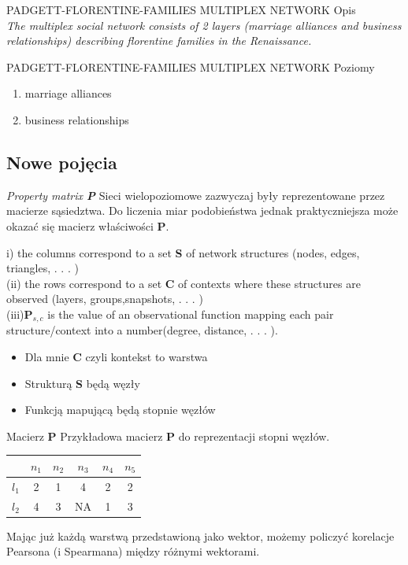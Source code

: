 \documentclass{beamer}
\begin{document}
\begin{frame}{PADGETT-FLORENTINE-FAMILIES
MULTIPLEX NETWORK}
Opis\\
\vspace{5mm}
\textit{The multiplex social network consists of 2 layers (marriage alliances and business
relationships) describing florentine families in the Renaissance.}
\end{frame}
\begin{frame}{PADGETT-FLORENTINE-FAMILIES
MULTIPLEX NETWORK}
Poziomy
\begin{enumerate}
\item marriage alliances
\item business relationships
\end{enumerate}
\end{frame}
 
\subsection{Nowe pojęcia}
\begin{frame}{\textit{Property matrix \textbf{P}}}
Sieci wielopoziomowe zazwyczaj były reprezentowane przez macierze sąsiedztwa. Do liczenia miar podobieństwa jednak praktyczniejsza może okazać się macierz właściwości \textbf{P}. 
\pause
\begin{theorem}
i)  the columns correspond to a set \textbf{S} of network structures (nodes, edges, triangles, . . . )
\\(ii)  the rows correspond to a set \textbf{C} of contexts where these structures are observed (layers, groups,snapshots, . . . )
\\(iii)\textbf{P}$_{s,c}$ is the value of an observational function mapping each pair structure/context into a number(degree, distance, . . . ).
\end{theorem}
\begin{itemize}
\item<3> Dla mnie \textbf{C} czyli kontekst to warstwa
\item<4> Strukturą \textbf{S} będą węzły
\item<5> Funkcją mapującą będą stopnie węzłów
\end{itemize}
\end{frame}

\begin{frame}{Macierz \textbf{P}}
Przykładowa macierz \textbf{P} do reprezentacji stopni węzłów.
\center
\begin{tabular}{l|ccccc}
      & $n_1$ & $n_2$ & $n_3$ & $n_4$ & $n_5$ \\\hline
$l_1$ & 2     & 1     &     4 &   2   &  2   \\
$l_2$ &4    & 3     &     NA &   1   &  3   \\
\end{tabular}
\pause
Mając już każdą warstwą przedstawioną jako wektor, możemy policzyć korelacje Pearsona (i Spearmana) między różnymi wektorami.
\end{frame}
\end{document}
